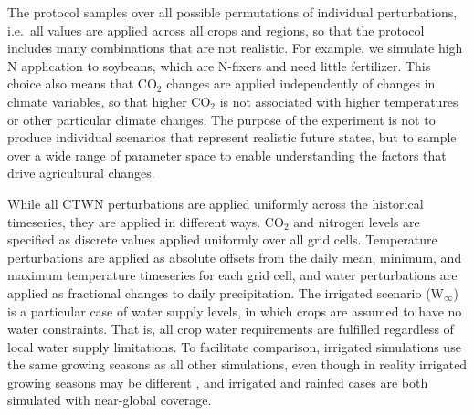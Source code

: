 \documentclass[gmd, manuscript]{copernicus} %
\begin{document}
The protocol samples over all possible permutations of individual perturbations, i.e.\ all values are applied across all crops and regions, so that the protocol includes  many combinations that are not realistic.  For example, we simulate high N application to soybeans, which are N-fixers and need little fertilizer. %
This choice also means that CO$_2$ changes are applied independently of changes in climate variables, so that higher CO$_2$ is not associated with higher temperatures or other particular climate changes. The purpose of the experiment is not to produce individual scenarios that represent realistic future states, but to sample over a wide range of parameter space to enable understanding the factors that drive agricultural changes. 

While all CTWN perturbations are applied uniformly across the historical timeseries, they are applied in different ways. 
CO$_2$ and nitrogen levels are specified as discrete values applied uniformly over all grid cells.
Temperature perturbations are applied as absolute offsets from the daily mean, minimum, and maximum temperature timeseries for each grid cell, and 
water perturbations are applied as fractional changes to daily precipitation. 
The irrigated scenario (W$_{\infty}$) is a particular case of water supply levels, in which crops are assumed to have no water constraints. That is, all crop water requirements are fulfilled regardless of local water supply limitations.
 To facilitate comparison, irrigated simulations use the same growing seasons as all other simulations, even though in reality irrigated growing seasons may be different \citep{Portmann2010}, and irrigated and rainfed cases  
 are both simulated with near-global coverage. %
\end{document}
